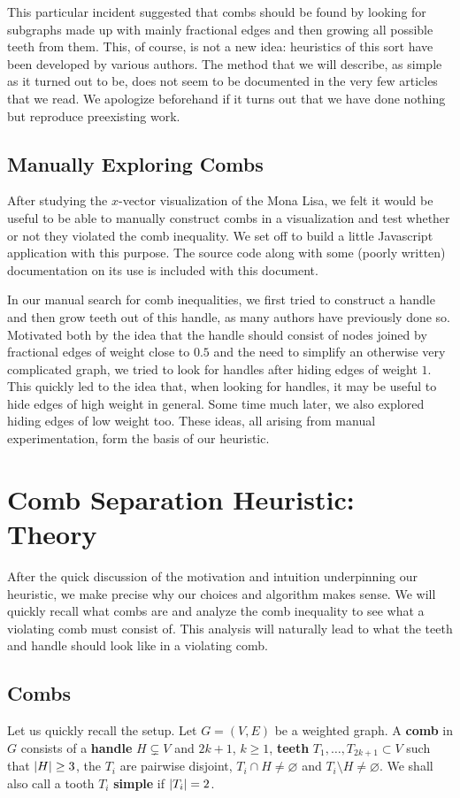 \documentclass[11pt, letterpaper]{amsart}
\theoremstyle{plain}
\theoremstyle{definition}
\theoremstyle{remark}
\DeclarePairedDelimiter{\abs}{\lvert}{\rvert}
\begin{document}
This particular incident suggested that combs should be found by looking for
subgraphs made up with mainly fractional edges and then growing all possible
teeth from them. This, of course, is not a new idea: heuristics of this sort
have been developed by various authors. The method that we will describe, as
simple as it turned out to be, does not seem to be documented in the very few
articles that we read. We apologize beforehand if it turns out that we have
done nothing but reproduce preexisting work.

\subsection{Manually Exploring Combs}
After studying the $x$-vector visualization of the Mona Lisa, we felt it would
be useful to be able to manually construct combs in a visualization and test
whether or not they violated the comb inequality. We set off to build a little
Javascript application with this purpose. The source code along with some
(poorly written) documentation on its use is included with this document.

In our manual search for comb inequalities, we first tried to construct a
handle and then grow teeth out of this handle, as many authors have previously
done so.  Motivated both by the idea that the handle should consist of nodes
joined by fractional edges of weight close to $0.5$ and the need to simplify an
otherwise very complicated graph, we tried to look for handles after hiding
edges of weight $1$. This quickly led to the idea that, when looking for
handles, it may be useful to hide edges of high weight in general. Some time
much later, we also explored hiding edges of low weight too. These ideas,
all arising from manual experimentation, form the basis of our heuristic.

\section{Comb Separation Heuristic: Theory}\label{sec:theory}
After the quick discussion of the motivation and intuition underpinning our
heuristic, we make precise why our choices and algorithm makes sense. We will
quickly recall what combs are and analyze the comb inequality to see what a
violating comb must consist of. This analysis will naturally lead to what the
teeth and handle should look like in a violating comb.

\subsection{Combs}
Let us quickly recall the setup. Let $G = (V,E)$ be a weighted graph. A
\textbf{comb} in $G$ consists of a \textbf{handle} $H \subsetneq V$ and $2k+1$,
$k \geq 1$, \textbf{teeth} $T_1,\ldots,T_{2k+1} \subset V$ such that $\abs{H}
\geq 3$, the $T_i$ are pairwise disjoint, $T_i \cap H \neq \varnothing$ and
$T_i \setminus H \neq \varnothing$. We shall also call a tooth $T_i$
\textbf{simple} if $\abs{T_i} = 2$.
\end{document}
